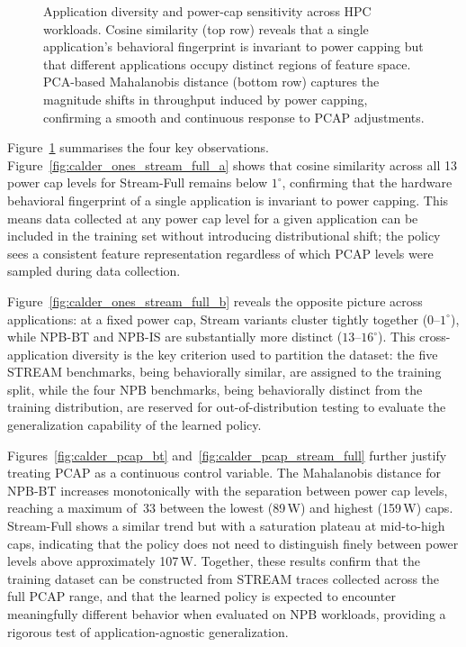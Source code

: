 \begin{figure}[tbp]
    \caption{Application diversity and power-cap sensitivity across HPC workloads.
             Cosine similarity (top row) reveals that a single application's
             behavioral fingerprint is invariant to power capping but that
             different applications occupy distinct regions of feature space.
             PCA-based Mahalanobis distance (bottom row) captures the magnitude
             shifts in throughput induced by power capping, confirming a smooth
             and continuous response to PCAP adjustments.}
    \label{fig:combined_similarity}
\end{figure}

Figure~\ref{fig:combined_similarity} summarises the four key observations.
Figure~\ref{fig:calder_ones_stream_full_a} shows that cosine similarity across all
13 power cap levels for Stream-Full remains below $1^\circ$, confirming that the
hardware behavioral fingerprint of a single application is invariant to power
capping.
This means data collected at any power cap level for a given application can be
included in the training set without introducing distributional shift; the policy
sees a consistent feature representation regardless of which PCAP levels were
sampled during data collection.

Figure~\ref{fig:calder_ones_stream_full_b} reveals the opposite picture across
applications: at a fixed power cap, Stream variants cluster tightly together
($0$--$1^\circ$), while NPB-BT and NPB-IS are substantially more distinct
($13$--$16^\circ$).
This cross-application diversity is the key criterion used to partition the
dataset: the five STREAM benchmarks, being behaviorally similar, are assigned
to the training split, while the four NPB benchmarks, being behaviorally
distinct from the training distribution, are reserved for out-of-distribution
testing to evaluate the generalization capability of the learned policy.

Figures~\ref{fig:calder_pcap_bt} and~\ref{fig:calder_pcap_stream_full} further
justify treating PCAP as a continuous control variable.
The Mahalanobis distance for NPB-BT increases monotonically with the separation
between power cap levels, reaching a maximum of~33 between the lowest (89\,W)
and highest (159\,W) caps.
Stream-Full shows a similar trend but with a saturation plateau at mid-to-high
caps, indicating that the policy does not need to distinguish finely between
power levels above approximately 107\,W.
Together, these results confirm that the training dataset can be constructed from
STREAM traces collected across the full PCAP range, and that the learned policy
is expected to encounter meaningfully different behavior when evaluated on NPB
workloads, providing a rigorous test of application-agnostic generalization.